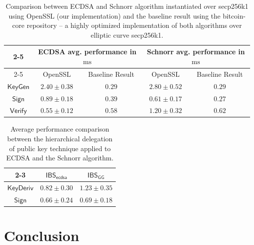 \documentclass[version=submission, floatrow]{iacrcc}
\begin{document}
\begin{table}[H]
\centering
\begin{tabular}{ccc|cc}
\cline{2-5}
\multicolumn{1}{l}{} & \multicolumn{2}{c|}{\textsf{ECDSA} avg. performance in $\si{\milli\second}$} & \multicolumn{2}{c}{\textsf{Schnorr} avg. performance in $\si{\milli\second}$} \\ \cline{2-5} 
\multicolumn{1}{l}{} & OpenSSL         & Baseline Result & OpenSSL         & Baseline Result \\ \hline
$\mathsf{KeyGen}$    & $2.40 \pm 0.38$ & $ 0.29 $ & $2.80 \pm 0.52$ & $ 0.29  $ \\ \hline
$\mathsf{Sign}$      & $0.89 \pm 0.18$ & $ 0.39 $ & $0.61 \pm 0.17$ & $ 0.27 $ \\ \hline
$\mathsf{Verify}$    & $0.55 \pm 0.12$ & $ 0.58 $ & $1.20 \pm 0.32$ & $ 0.62 $ \\ \hline
\end{tabular}
\caption{Comparison between \textsf{ECDSA} and \textsf{Schnorr} algorithm instantiated over \textsf{secp256k1} using OpenSSL (our implementation) and the baseline result using the \textsf{bitcoin-core} repository \cite{secp256k1} -- a highly optimized implementation of both algorithms over elliptic curve \textsf{secp256k1}.}
\label{table: comparison openssl vs. bitcoin-core}
\end{table}

\begin{table}[ht!]
\centering
\begin{tabular}{cc|c}
\cline{2-3}
\multicolumn{1}{l}{} & $\mathsf{IBS}_{\mathsf{ecdsa}}$ & $\mathsf{IBS}_{\mathsf{GG}}$ \\ \hline
$\mathsf{KeyDeriv}$  & $0.82 \pm 0.30$                 & $1.23 \pm 0.35$              \\ \hline
$\mathsf{Sign}$      & $0.66 \pm 0.24$                 & $0.69 \pm 0.18$              \\ \hline
\end{tabular}
\caption{Average performance comparison between the hierarchical delegation of public key technique applied to ECDSA and the Schnorr algorithm.}
\label{table: comparison ibsecdsa vs. ibsschnorr}
\end{table}


\section{Conclusion}\label{sec:conclusion}
\end{document}
